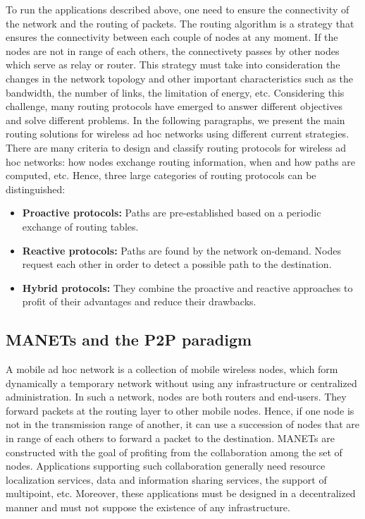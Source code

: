 To run the applications described above, one need to ensure the connectivity of the network and the routing of packets. The routing algorithm is a strategy that ensures the connectivity between each couple of nodes at any moment. If the nodes are not in range of each others, the connectivety passes by other nodes which serve as relay or router. This strategy must take into consideration the changes in the network topology and other important characteristics such as the bandwidth, the number of links, the limitation of energy, etc. Considering this challenge, many routing protocols have emerged to answer different objectives and solve different problems.  In the following paragraphs, we present the main routing solutions for wireless ad hoc networks using different current strategies. There are many criteria to design and classify routing protocols for wireless ad hoc networks: how nodes exchange routing information, when and how paths are computed, etc. Hence, three large categories of routing protocols can be distinguished:

\begin{itemize}
\item{\textbf{Proactive protocols:} Paths are pre-established based on a periodic exchange of routing tables.}
\item{\textbf{Reactive protocols:} Paths are found by the network on-demand. Nodes request each other in order to detect a possible path to the destination.}
\item{\textbf{Hybrid protocols:} They combine the proactive and reactive approaches to profit of their advantages and reduce their drawbacks.}
\end{itemize}

\subsection{MANETs and the P2P paradigm}

A mobile ad hoc network is a collection of mobile wireless nodes, which form dynamically a temporary network without using any infrastructure or centralized administration. In such a network, nodes are both routers and end-users. They forward packets at the routing layer to other mobile nodes. Hence, if one node is not in the transmission range of another, it can use a succession of nodes that are in range of each others to forward a packet to the destination. MANETs are constructed with the goal of profiting from the collaboration among the set of nodes.  Applications supporting such collaboration generally need resource localization services, data and information sharing services, the support of multipoint, etc. Moreover, these applications must be designed in a decentralized manner and must not suppose the existence of any infrastructure.

